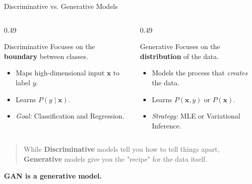 \documentclass[aspectratio=169,xcolor=dvipsnames,svgnames,x11names,fleqn]{beamer}
\begin{document}
\begin{frame}{Discriminative vs. Generative Models}
    \begin{columns}[T]
        \begin{column}{0.49\textwidth}
            \centering
            \begin{block}{Discriminative}
                \small Focuses on the \textbf{boundary} between classes.
                \vspace{0.5em}
                \begin{itemize}
                    \item Maps high-dimensional input $\mathbf{x}$ to label $y$.
                    \item Learns $P(y \mid \mathbf{x})$.
                    \item \textit{Goal:} Classification and Regression.
                \end{itemize}
            \end{block}
        \end{column}
        
        \begin{column}{0.49\textwidth}
            \centering
            \begin{block}{Generative}
                \small Focuses on the \textbf{distribution} of the data.
                \vspace{0.5em}
                \begin{itemize}
                    \item Models the process that \textit{creates} the data.
                    \item Learns $P(\mathbf{x}, y)$ or $P(\mathbf{x})$.
                    \item \textit{Strategy:} MLE or Variational Inference.
                \end{itemize}
            \end{block}
        \end{column}
    \end{columns}

    \vspace{1.5em}

    \begin{quote}
        \centering
        \small
        While \textbf{Discriminative} models tell you how to tell things apart, \textbf{Generative} models give you the "recipe" for the data itself.
    \end{quote}
    	\centering
    	
    \textbf{	GAN is a generative model.}
    	
\end{frame}
\end{document}
